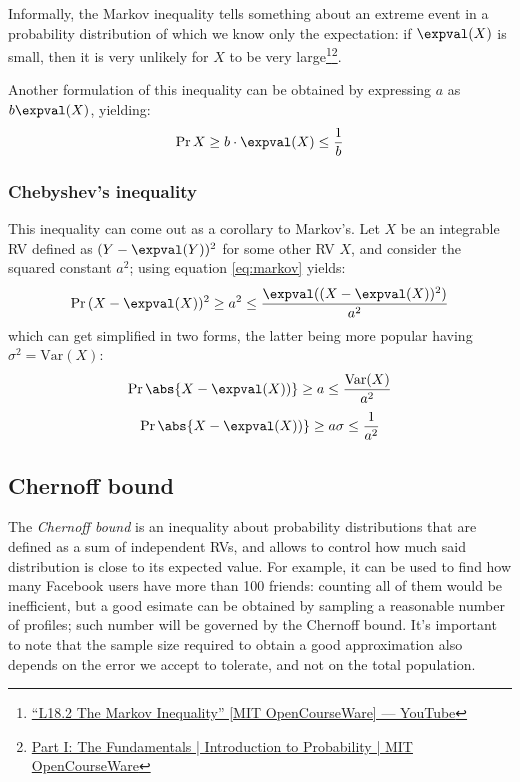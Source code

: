 Informally, the Markov inequality tells something about an extreme event in a probability distribution of which we know only the expectation: if $\expval(X)$ is small, then it is very unlikely for $X$ to be very large\footnote{\linkicon \href{https://youtu.be/vjYanZ1nsZg}{\textsf{``L18.2 The Markov Inequality'' [MIT OpenCourseWare] --- YouTube}}}\footnote{\linkicon \href{https://ocw.mit.edu/resources/res-6-012-introduction-to-probability-spring-2018/part-i-the-fundamentals/}{\textsf{Part I: The Fundamentals | Introduction to Probability | MIT OpenCourseWare}}}.

Another formulation of this inequality can be obtained by expressing $a$ as $b \expval(X)$, yielding:
\begin{equation}\label{eq:markov2}
    \Pr{X \geq b \cdot \expval(X)} \leq \frac{1}{b}
\end{equation}


\subsubsection{Chebyshev's inequality}

This inequality can come out as a corollary to Markov's. Let $X$ be an integrable RV defined as $(Y - \expval(Y))^2$ for some other RV $X$, and consider the squared constant $a^2$; using equation \ref{eq:markov} yields:
\[
    \Pr{(X - \expval(X))^2 \geq a^2} \leq \frac{\expval((X - \expval(X))^2)}{a^2}
\]
which can get simplified in two forms, the latter being more popular having $\sigma^2 = \text{Var}(X)$:
\begin{equation}\label{eq:chebyshev2}
    \Pr{\abs{X - \expval(X))} \geq a} \leq \frac{\text{Var}(X)}{a^2}
\end{equation}
\begin{equation}\label{eq:chebyshev}
    \Pr{\abs{X - \expval(X))} \geq a \sigma} \leq \frac{1}{a^2}
\end{equation}


\subsection{Chernoff bound}

The \emph{Chernoff bound} is an inequality about probability distributions that are defined as a sum of independent RVs, and allows to control how much said distribution is close to its expected value. For example, it can be used to find how many Facebook users have more than 100 friends: counting all of them would be inefficient, but a good esimate can be obtained by sampling a reasonable number of profiles; such number will be governed by the Chernoff bound. It's important to note that the sample size required to obtain a good approximation also depends on the error we accept to tolerate, and not on the total population.

